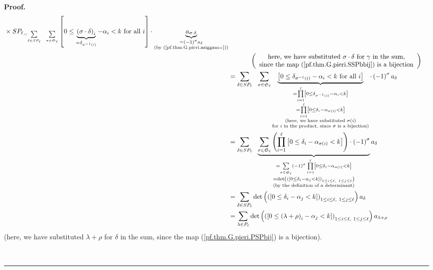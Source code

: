 \documentclass[numbers=enddot,12pt,final,onecolumn,notitlepage]{scrartcl}%
\theoremstyle{definition}
\newenvironment{proof}[1][Proof]{\noindent\textbf{#1.} }{\ \rule{0.5em}{0.5em}}
\let\sumnonlimits\sum
\let\prodnonlimits\prod
\renewcommand{\sum}{\sumnonlimits\limits}
\renewcommand{\prod}{\prodnonlimits\limits}
\newenvironment{verlong}{}{}
\begin{document}
\begin{verlong}
\begin{proof}
\begin{align}
{{{}\times SP_{\ell}}}_{=\sum_{\delta\in SP_{\ell}}\ \ \sum_{\sigma
\in\mathfrak{S}_{\ell}}}\left[  0\leq\underbrace{\left(  \sigma\cdot
\delta\right)  _{i}}_{=\delta_{\sigma^{-1}\left(  i\right)  }}-\alpha
_{i}<k\text{ for all }i\right]  \cdot\underbrace{a_{\sigma\cdot\delta}%
}_{\substack{=\left(  -1\right)  ^{\sigma}a_{\delta}\\\text{(by
(\ref{pf.thm.G.pieri.asiggam=}))}}}\nonumber\\
&  \ \ \ \ \ \ \ \ \ \ \left(
\begin{array}
[c]{c}%
\text{here, we have substituted }\sigma\cdot\delta\text{ for }\gamma\text{ in
the sum,}\\
\text{since the map (\ref{pf.thm.G.pieri.SSPbbij}) is a bijection}%
\end{array}
\right) \nonumber\\
&  =\sum_{\delta\in SP_{\ell}}\ \ \sum_{\sigma\in\mathfrak{S}_{\ell}%
}\underbrace{\left[  0\leq\delta_{\sigma^{-1}\left(  i\right)  }-\alpha
_{i}<k\text{ for all }i\right]  }_{\substack{=\prod_{i=1}^{\ell}\left[
0\leq\delta_{\sigma^{-1}\left(  i\right)  }-\alpha_{i}<k\right]
\\=\prod_{i=1}^{\ell}\left[  0\leq\delta_{i}-\alpha_{\sigma\left(  i\right)
}<k\right]  \\\text{(here, we have substituted }\sigma\left(  i\right)
\\\text{for }i\text{ in the product, since }\sigma\text{ is a bijection)}%
}}\cdot\left(  -1\right)  ^{\sigma}a_{\delta}\nonumber\\
&  =\sum_{\delta\in SP_{\ell}}\ \ \underbrace{\sum_{\sigma\in\mathfrak{S}%
_{\ell}}\left(  \prod_{i=1}^{\ell}\left[  0\leq\delta_{i}-\alpha
_{\sigma\left(  i\right)  }<k\right]  \right)  \cdot\left(  -1\right)
^{\sigma}}_{\substack{=\sum_{\sigma\in\mathfrak{S}_{\ell}}\left(  -1\right)
^{\sigma}\prod_{i=1}^{\ell}\left[  0\leq\delta_{i}-\alpha_{\sigma\left(
i\right)  }<k\right]  \\=\det\left(  \left(  \left[  0\leq\delta_{i}%
-\alpha_{j}<k\right]  \right)  _{1\leq i\leq\ell,\ 1\leq j\leq\ell}\right)
\\\text{(by the definition of a determinant)}}}a_{\delta}\nonumber\\
&  =\sum_{\delta\in SP_{\ell}}\det\left(  \left(  \left[  0\leq\delta
_{i}-\alpha_{j}<k\right]  \right)  _{1\leq i\leq\ell,\ 1\leq j\leq\ell
}\right)  a_{\delta}\nonumber\\
&  =\sum_{\lambda\in P_{\ell}}\det\left(  \left(  \left[  0\leq\left(
\lambda+\rho\right)  _{i}-\alpha_{j}<k\right]  \right)  _{1\leq i\leq
\ell,\ 1\leq j\leq\ell}\right)  a_{\lambda+\rho} \label{pf.thm.G.pieri.prod2}%
\end{align}
(here, we have substituted $\lambda+\rho$ for $\delta$ in the sum, since the
map (\ref{pf.thm.G.pieri.PSPbij}) is a bijection).


\end{proof}
\end{verlong}
\end{document}
